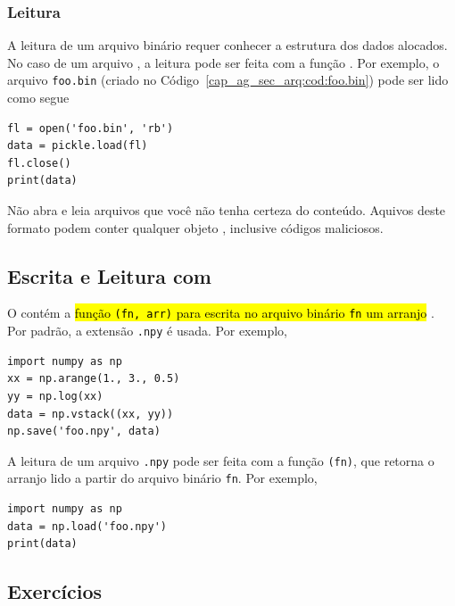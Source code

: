 \subsubsection{Leitura}

A leitura de um arquivo binário requer conhecer a estrutura dos dados alocados. No caso de um arquivo {\PYTHONpickle}, a leitura pode ser feita com a função {\PYTHONpickleDOTload}. Por exemplo, o arquivo \texttt{foo.bin} (criado no Código~\ref{cap_ag_sec_arq:cod:foo.bin}) pode ser lido como segue

\begin{lstlisting}
fl = open('foo.bin', 'rb')
data = pickle.load(fl)
fl.close()
print(data)
\end{lstlisting}

\begin{obs}[\hl{Atenção}]
  Não abra e leia arquivos {\PYTHONpickle} que você não tenha certeza do conteúdo. Aquivos deste formato podem conter qualquer objeto {\python}, inclusive códigos maliciosos.
\end{obs}

\subsection{Escrita e Leitura com {\numpy}}

O {\numpy} contém a \hl{função {\PYTHONnumpyDOTsave}\texttt{(fn, arr)} para escrita no arquivo binário \texttt{fn} um arranjo {\PYTHONnumpyDOTarray}}. Por padrão, a extensão \texttt{.npy} é usada. Por exemplo,

\begin{lstlisting}
import numpy as np
xx = np.arange(1., 3., 0.5)
yy = np.log(xx)
data = np.vstack((xx, yy))
np.save('foo.npy', data)
\end{lstlisting}

A leitura de um arquivo \texttt{.npy} pode ser feita com a função {\PYTHONnumpyDOTload}\texttt{(fn)}, que retorna o arranjo lido a partir do arquivo binário \texttt{fn}. Por exemplo,

\begin{lstlisting}
import numpy as np
data = np.load('foo.npy')
print(data)
\end{lstlisting}

\subsection{Exercícios}

